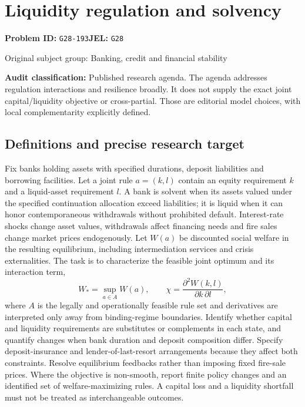 \documentclass[11pt,a4paper]{article}
\begin{document}
\section*{Liquidity regulation and solvency}
\textbf{Problem ID:} \texttt{G28-193}\quad \textbf{JEL:} \texttt{G28}\par
\label{problem:OP-0321}
{\sffamily\small\color{muted}Original subject group: Banking, credit and financial stability\par}
\label{definitions:problem:30007603}
\textbf{Audit classification:} Published research agenda. The agenda addresses regulation interactions and resilience broadly. It does not supply the exact joint capital/liquidity objective or cross-partial. Those are editorial model choices, with local complementarity explicitly defined.
\subsection*{Definitions and precise research target}
Fix banks holding assets with specified durations, deposit liabilities and borrowing facilities. Let a joint rule \(a=(k,l)\) contain an equity requirement \(k\) and a liquid-asset requirement \(l\). A bank is solvent when its assets valued under the specified continuation allocation exceed liabilities; it is liquid when it can honor contemporaneous withdrawals without prohibited default. Interest-rate shocks change asset values, withdrawals affect financing needs and fire sales change market prices endogenously. Let \(W(a)\) be discounted social welfare in the resulting equilibrium, including intermediation services and crisis externalities. The task is to characterize the feasible joint optimum and its interaction term,
\[W_*=\sup_{a\in A}W(a),\qquad\chi=\frac{\partial^2W(k,l)}{\partial k\,\partial l},\]
where \(A\) is the legally and operationally feasible rule set and derivatives are interpreted only away from binding-regime boundaries. Identify whether capital and liquidity requirements are substitutes or complements in each state, and quantify changes when bank duration and deposit composition differ. Specify deposit-insurance and lender-of-last-resort arrangements because they affect both constraints. Resolve equilibrium feedbacks rather than imposing fixed fire-sale prices. Where the objective is non-smooth, report finite policy changes and an identified set of welfare-maximizing rules. A capital loss and a liquidity shortfall must not be treated as interchangeable outcomes.
\end{document}
